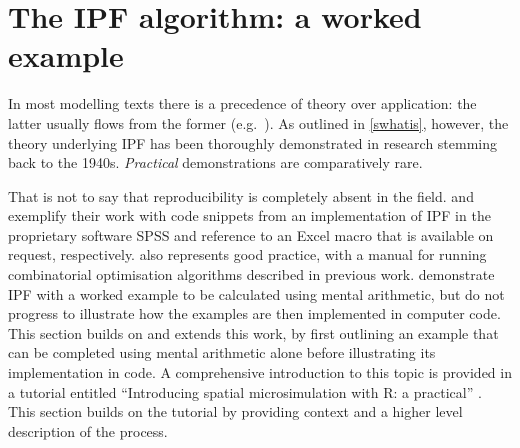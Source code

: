 \documentclass[a4paper,10pt]{article}
\begin{document}
\section{The IPF algorithm: a worked example} \label{s:theory}
In most modelling texts there is a precedence of theory over
application: the latter usually flows from the former
(e.g.~\citealp{batty1976urban}).  
As outlined in \cref{swhatis}, however, the theory underlying IPF has
been thoroughly demonstrated in research stemming back to the 1940s.
\emph{Practical} demonstrations
are comparatively rare.


That is not to say that reproducibility is completely absent in the field.
\citet{Simpson2005} and \citet{Norman1999a}
exemplify their work with code snippets from an implementation
of IPF in the proprietary software SPSS and reference to
an Excel macro that is available on request, respectively.
\citet{Williamson2007} also represents
good practice, with a manual for running 
combinatorial optimisation algorithms described in previous work.
\citet{Ballas2005c} demonstrate IPF with a worked example
to be calculated using mental arithmetic, but do not progress to
illustrate how the examples are then implemented in computer code.
This section builds on and extends this work, by first outlining an example that
can be completed using mental arithmetic alone before illustrating its
implementation in code. A comprehensive introduction to
this topic is provided in a tutorial entitled
 ``Introducing spatial microsimulation with R: a practical'' \citep{lovelace2014introducing}. This section builds on the tutorial by providing
context and a higher level description of the process.


\end{document}
